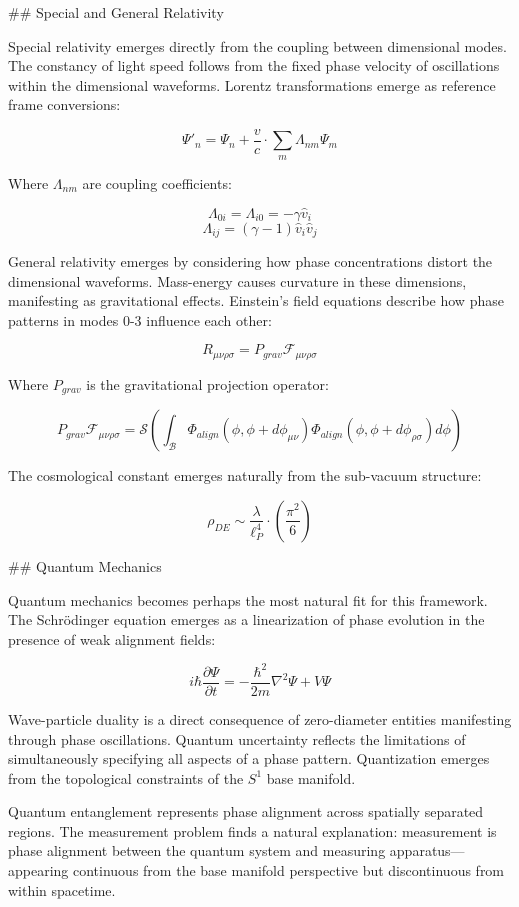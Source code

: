 ## Special and General Relativity

Special relativity emerges directly from the coupling between dimensional modes. The constancy of light speed follows from the fixed phase velocity of oscillations within the dimensional waveforms. Lorentz transformations emerge as reference frame conversions:

$$\Psi'_n = \Psi_n + \frac{v}{c} \cdot \sum_m \Lambda_{nm}\Psi_m$$

Where $\Lambda_{nm}$ are coupling coefficients:

$$\Lambda_{0i} = \Lambda_{i0} = -\gamma\hat{v}_i$$
$$\Lambda_{ij} = (\gamma-1)\hat{v}_i\hat{v}_j$$

General relativity emerges by considering how phase concentrations distort the dimensional waveforms. Mass-energy causes curvature in these dimensions, manifesting as gravitational effects. Einstein's field equations describe how phase patterns in modes 0-3 influence each other:

$$R_{\mu\nu\rho\sigma} = P_{grav}\mathcal{F}_{\mu\nu\rho\sigma}$$

Where $P_{grav}$ is the gravitational projection operator:

$$P_{grav}\mathcal{F}_{\mu\nu\rho\sigma} = \mathcal{S}\left(\int_{\mathcal{B}} \Phi_{align}(\phi,\phi+d\phi_{\mu\nu})\Phi_{align}(\phi,\phi+d\phi_{\rho\sigma}) d\phi\right)$$

The cosmological constant emerges naturally from the sub-vacuum structure:

$$\rho_{DE} \sim \frac{\lambda}{\ell_P^4} \cdot \left(\frac{\pi^2}{6}\right)$$

## Quantum Mechanics

Quantum mechanics becomes perhaps the most natural fit for this framework. The Schrödinger equation emerges as a linearization of phase evolution in the presence of weak alignment fields:

$$i\hbar\frac{\partial\Psi}{\partial t} = -\frac{\hbar^2}{2m}\nabla^2\Psi + V\Psi$$

Wave-particle duality is a direct consequence of zero-diameter entities manifesting through phase oscillations. Quantum uncertainty reflects the limitations of simultaneously specifying all aspects of a phase pattern. Quantization emerges from the topological constraints of the $S^1$ base manifold.

Quantum entanglement represents phase alignment across spatially separated regions. The measurement problem finds a natural explanation: measurement is phase alignment between the quantum system and measuring apparatus—appearing continuous from the base manifold perspective but discontinuous from within spacetime.

